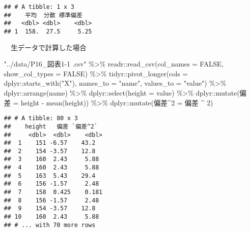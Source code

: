 \documentclass[
  12pt,
]{book}
\newenvironment{Shaded}{\begin{snugshade}}{\end{snugshade}}
\newcommand{\AttributeTok}[1]{\textcolor[rgb]{0.77,0.63,0.00}{#1}}
\newcommand{\ConstantTok}[1]{\textcolor[rgb]{0.00,0.00,0.00}{#1}}
\newcommand{\DecValTok}[1]{\textcolor[rgb]{0.00,0.00,0.81}{#1}}
\newcommand{\FunctionTok}[1]{\textcolor[rgb]{0.00,0.00,0.00}{#1}}
\newcommand{\NormalTok}[1]{#1}
\newcommand{\OtherTok}[1]{\textcolor[rgb]{0.56,0.35,0.01}{#1}}
\newcommand{\SpecialCharTok}[1]{\textcolor[rgb]{0.00,0.00,0.00}{#1}}
\newcommand{\StringTok}[1]{\textcolor[rgb]{0.31,0.60,0.02}{#1}}
\begin{document}
\begin{verbatim}
## # A tibble: 1 x 3
##    平均  分散 標準偏差
##   <dbl> <dbl>    <dbl>
## 1  158.  27.5     5.25
\end{verbatim}

　生データで計算した場合

\begin{Shaded}
\begin{Highlighting}[]
\StringTok{"../data/P16\_図表1{-}1 .csv"} \SpecialCharTok{\%\textgreater{}\%} 
\NormalTok{  readr}\SpecialCharTok{::}\FunctionTok{read\_csv}\NormalTok{(}\AttributeTok{col\_names =} \ConstantTok{FALSE}\NormalTok{, }\AttributeTok{show\_col\_types =} \ConstantTok{FALSE}\NormalTok{) }\SpecialCharTok{\%\textgreater{}\%} 
\NormalTok{  tidyr}\SpecialCharTok{::}\FunctionTok{pivot\_longer}\NormalTok{(}\AttributeTok{cols =}\NormalTok{ dplyr}\SpecialCharTok{::}\FunctionTok{starts\_with}\NormalTok{(}\StringTok{"X"}\NormalTok{),}
                      \AttributeTok{names\_to =} \StringTok{"name"}\NormalTok{, }\AttributeTok{values\_to =} \StringTok{"value"}\NormalTok{) }\SpecialCharTok{\%\textgreater{}\%} 
\NormalTok{  dplyr}\SpecialCharTok{::}\FunctionTok{arrange}\NormalTok{(name) }\SpecialCharTok{\%\textgreater{}\%} 
\NormalTok{  dplyr}\SpecialCharTok{::}\FunctionTok{select}\NormalTok{(}\AttributeTok{height =}\NormalTok{ value) }\SpecialCharTok{\%\textgreater{}\%} 
\NormalTok{  dplyr}\SpecialCharTok{::}\FunctionTok{mutate}\NormalTok{(}\StringTok{\textasciigrave{}}\AttributeTok{偏差}\StringTok{\textasciigrave{}} \OtherTok{=}\NormalTok{ height }\SpecialCharTok{{-}} \FunctionTok{mean}\NormalTok{(height)) }\SpecialCharTok{\%\textgreater{}\%} 
\NormalTok{  dplyr}\SpecialCharTok{::}\FunctionTok{mutate}\NormalTok{(}\StringTok{\textasciigrave{}}\AttributeTok{偏差\^{}2}\StringTok{\textasciigrave{}} \OtherTok{=} \StringTok{\textasciigrave{}}\AttributeTok{偏差}\StringTok{\textasciigrave{}} \SpecialCharTok{\^{}} \DecValTok{2}\NormalTok{)}
\end{Highlighting}
\end{Shaded}

\begin{verbatim}
## # A tibble: 80 x 3
##    height   偏差 `偏差^2`
##     <dbl>  <dbl>    <dbl>
##  1    151 -6.57    43.2  
##  2    154 -3.57    12.8  
##  3    160  2.43     5.88 
##  4    160  2.43     5.88 
##  5    163  5.43    29.4  
##  6    156 -1.57     2.48 
##  7    158  0.425    0.181
##  8    156 -1.57     2.48 
##  9    154 -3.57    12.8  
## 10    160  2.43     5.88 
## # ... with 70 more rows
\end{verbatim}
\end{document}
